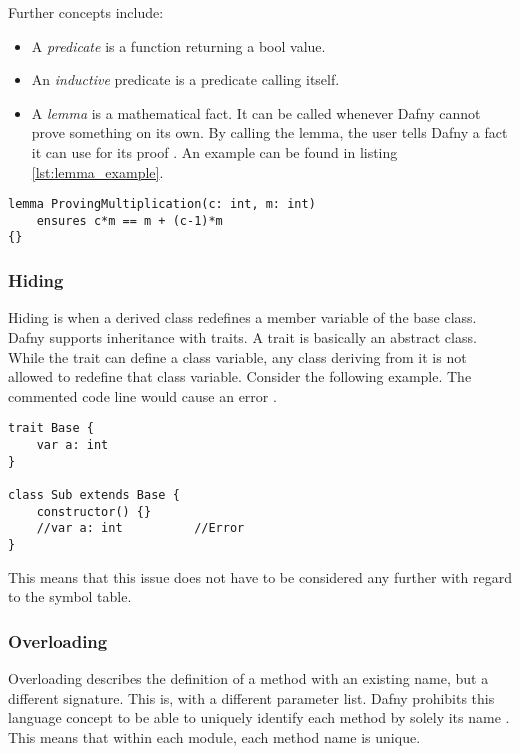 Further concepts include:
\begin{itemize}
\item A \textit{predicate} is a function returning a bool value.
\item An \textit{inductive} predicate is a predicate calling itself.
\item A \textit{lemma} is a mathematical fact.
It can be called whenever Dafny cannot prove something on its own.
By calling the lemma, the user tells Dafny a fact it can use for its proof \cite{dafnyReferenceManual}.
An example can be found in listing \ref{lst:lemma_example}.
\end{itemize}

\begin{lstlisting}[language=dafny, caption={Lemma}, captionpos=b, label={lst:lemma_example}]
lemma ProvingMultiplication(c: int, m: int)
    ensures c*m == m + (c-1)*m
{}
\end{lstlisting}

\subsubsection{Hiding}
Hiding is when a derived class redefines a member variable of the base class.
Dafny supports inheritance with traits.
A trait is basically an abstract class.
While the trait can define a class variable, any class deriving from it is not allowed to redefine that class variable.
Consider the following example.
The commented code line would cause an error \cite{dafnyReferenceManual}.

\begin{lstlisting}[language=dafny, caption={Hiding}, captionpos=b, label={lst:hiding}]
trait Base {
    var a: int
}

class Sub extends Base {
    constructor() {}
    //var a: int          //Error
}
\end{lstlisting}

This means that this issue does not have to be considered any further with regard to the symbol table.

\subsubsection{Overloading}
Overloading describes the definition of a method with an existing name, but a different signature.
This is, with a different parameter list.
Dafny prohibits this language concept to be able to uniquely identify each method by solely its name \cite{dafnyReferenceManual}.
This means that within each module, each method name is unique.

